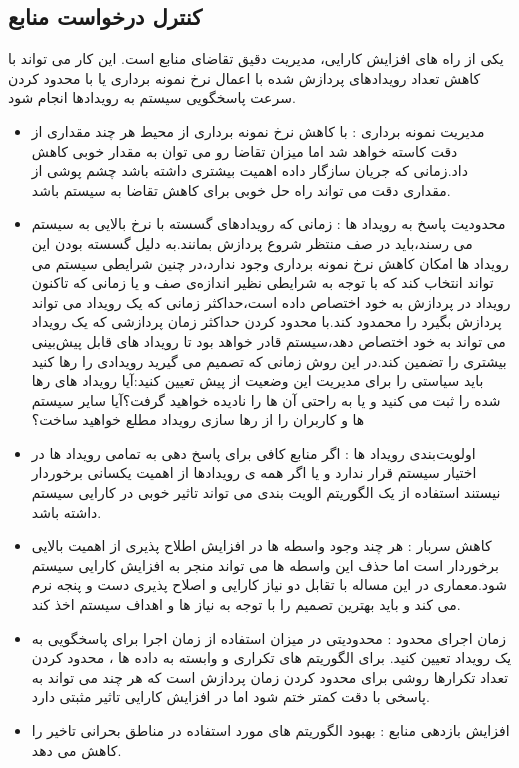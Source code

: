 \subsection{کنترل درخواست منابع}
یکی از راه های افزایش کارایی، مدیریت دقیق تقاضای منابع است. این کار می تواند با کاهش تعداد رویدادهای پردازش شده با اعمال نرخ نمونه برداری یا با محدود کردن سرعت پاسخگویی سیستم به رویدادها انجام شود.
\begin{itemize}
\item
مدیریت نمونه برداری : با کاهش نرخ نمونه برداری از محیط هر چند مقداری از دقت کاسته خواهد شد اما میزان تقاضا رو می توان به مقدار خوبی کاهش داد.زمانی که جریان سازگار داده اهمیت بیشتری داشته باشد چشم پوشی از مقداری دقت می تواند راه حل خوبی برای کاهش تقاضا به سیستم باشد.
\item
محدودیت پاسخ به رویداد ها : زمانی که رویداد‌های گسسته با نرخ بالایی به سیستم می رسند،‌باید در صف منتظر شروع پردازش بمانند.به دلیل گسسته بودن این رویداد ها امکان کاهش نرخ نمونه برداری وجود ندارد،در چنین شرایطی سیستم می تواند انتخاب کند که با توجه به شرایطی نظیر اندازه‌ی صف و یا زمانی که تاکنون رویداد در پردازش به خود اختصاص داده است،‌حداکثر زمانی که یک رویداد می تواند پردازش بگیرد را محمدود کند.با محدود کردن حداکثر زمان پردازشی که یک رویداد می تواند به خود اختصاص دهد،‌سیستم قادر خواهد بود تا رویداد های قابل پیش‌بینی بیشتری را تضمین کند.در این روش زمانی که تصمیم می گیرید رویدادی را رها کنید باید سیاستی را برای مدیریت این وضعیت از پیش تعیین کنید‌:آیا رویداد های رها شده را ثبت می کنید و یا به راحتی آن ها را نادیده خواهید گرفت؟آیا سایر سیستم ها و کاربران را از رها سازی رویداد مطلع خواهید ساخت؟
\item 
اولویت‌بندی رویداد ها : اگر منابع کافی برای پاسخ دهی به تمامی رویداد ها در اختیار سیستم قرار ندارد و یا اگر همه ی رویداد‌ها از اهمیت یکسانی برخوردار نیستند استفاده از یک الگوریتم الویت بندی می تواند تاثیر خوبی در کارایی سیستم داشته باشد.
\item
کاهش سربار : هر چند وجود واسطه ها در افزایش اطلاح پذیری از اهمیت بالایی برخوردار است اما حذف این واسطه ها می تواند منجر به افزایش کارایی سیستم شود.معماری در این مساله با تقابل دو نیاز کارایی و اصلاح پذیری دست و پنجه نرم می کند و باید بهترین تصمیم را با توجه به نیاز ها و اهداف سیستم اخذ کند.
\item
زمان اجرای محدود : محدودیتی در میزان استفاده از زمان اجرا برای پاسخگویی به یک رویداد تعیین کنید. برای الگوریتم های تکراری و وابسته به داده ها ، محدود کردن تعداد تکرارها روشی برای محدود کردن زمان پردازش است که هر چند می تواند به پاسخی با دقت کمتر ختم شود اما در افزایش کارایی تاثیر مثبتی دارد.
\item
افزایش بازدهی منابع : بهبود الگوریتم های مورد استفاده در مناطق بحرانی
تاخیر را کاهش می دهد.
\end{itemize}
